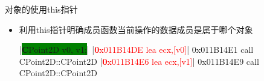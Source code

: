 \begin{frame}[t, fragile]{对象的使用}{this指针}%
  \begin{itemize}
  \item 利用this指针明确成员函数当前操作的数据成员是属于哪个对象\\
    \begin{center}
      \begin{minipage}{0.4\linewidth}
      \end{minipage}\quad
      \begin{minipage}{0.55\linewidth}
        \centering
        \begin{cpptt}
|\colorbox{green}{\textbf CPoint2D v0, v1;}|
|\textcolor{red}{\textbf 0x011B14DE  lea      ecx,[v0]}| 
0x011B14E1  call     CPoint2D::CPoint2D
|\textcolor{red}{\textbf 0x011B14E6  lea      ecx,[v1]}|
0x011B14E9  call     CPoint2D::CPoint2D
        \end{cpptt}
      \end{minipage}
    \end{center}
  \end{itemize}
\end{frame}

